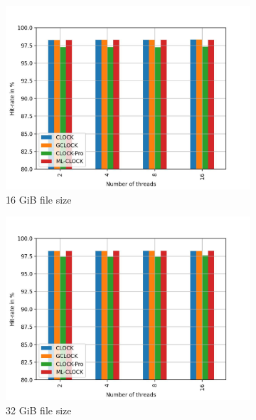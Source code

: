 \documentclass[
	12pt,
	a4paper,
	abstract,
	bibliography=totoc,
	chapterprefix,
	headings=openright,
	numbers=endperiod,
	parskip=half,
	twoside,
]{scrreprt}
\begin{document}
\begin{figure}[H]
	\centering
	\begin{subfigure}{0.4\textwidth}
		\includegraphics[width=\textwidth]{multi_16_gb_randread_uniform.jpg}		
		\caption{16 GiB file size}
		\label{fig:rw_90to10  zipf}
	\end{subfigure}
	\hfill
	\begin{subfigure}{0.4\textwidth}
		\includegraphics[width=\textwidth]{multi_32_gb_randread_uniform.jpg}		
		\caption{32 GiB file size}
		\label{fig:rw_90to10  normal}
	\end{subfigure}
	\hfill
	\begin{subfigure}{0.4\textwidth}

\end{subfigure}
\end{figure}
\end{document}

